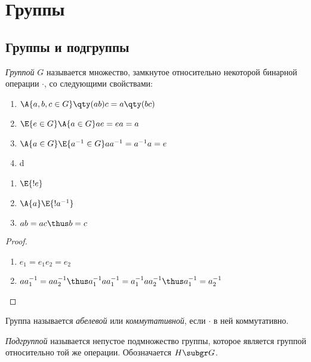 \section{Группы}
\subsection{Группы и подгруппы}

\begin{definition}
  \emph{Группой} $G$ называется множество, замкнутое относительно некоторой бинарной операции $\cdotp$, со следующими свойствами:
  \begin{enumerate}
    \item $\A{a,b,c \in G}\qty(ab)c=a\qty(bc)$
    \item $\E{e\in G}\A{a \in G} ae=ea=a$
    \item $\A{a\in G}\E{a^{-1}\in G} aa^{-1}=a^{-1} a=e$
    \item d
  \end{enumerate}
\end{definition}

\begin{theorem}
  \theoremlistshack
  \begin{enumerate}
    \item $\E{!e}$
    \item $\A{a}\E{!a^{-1}}$
    \item $ab=ac \thus b=c$
  \end{enumerate}
\end{theorem}
\begin{proof}
  \theoremlistshack
  \begin{enumerate}
    \item $e_1=e_1e_2=e_2$
    \item $aa^{-1}_1=aa^{-1}_2 \thus a^{-1}_1aa^{-1}_1=a^{-1}_1aa^{-1}_2\thus a^{-1}_1=a^{-1}_2$
  \end{enumerate}
\end{proof}

\begin{definition}
  Группа называется \emph{абелевой} или \emph{коммутативной}, если $\cdotp$ в ней коммутативно.
\end{definition}

\begin{definition}
  \emph{Подгруппой} называется непустое подмножество группы, которое является группой относительно той же операции. Обозначается $H \subgr G$.
\end{definition}

